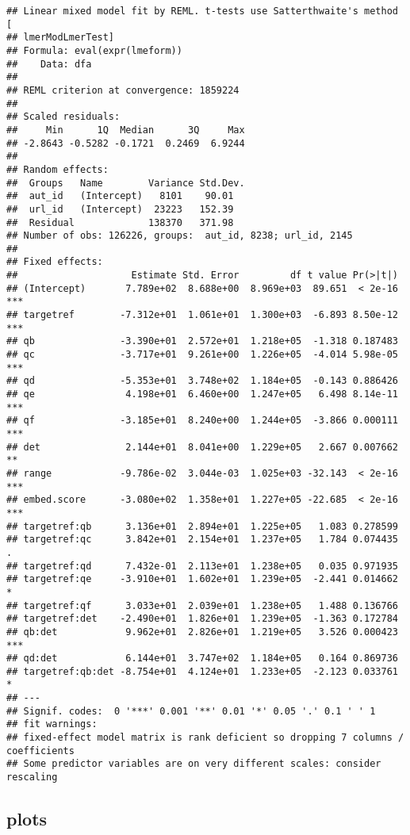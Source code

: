 \documentclass[
  12pt,
  oneside]{book}
\begin{document}
\begin{verbatim}
## Linear mixed model fit by REML. t-tests use Satterthwaite's method [
## lmerModLmerTest]
## Formula: eval(expr(lmeform))
##    Data: dfa
## 
## REML criterion at convergence: 1859224
## 
## Scaled residuals: 
##     Min      1Q  Median      3Q     Max 
## -2.8643 -0.5282 -0.1721  0.2469  6.9244 
## 
## Random effects:
##  Groups   Name        Variance Std.Dev.
##  aut_id   (Intercept)   8101    90.01  
##  url_id   (Intercept)  23223   152.39  
##  Residual             138370   371.98  
## Number of obs: 126226, groups:  aut_id, 8238; url_id, 2145
## 
## Fixed effects:
##                    Estimate Std. Error         df t value Pr(>|t|)    
## (Intercept)       7.789e+02  8.688e+00  8.969e+03  89.651  < 2e-16 ***
## targetref        -7.312e+01  1.061e+01  1.300e+03  -6.893 8.50e-12 ***
## qb               -3.390e+01  2.572e+01  1.218e+05  -1.318 0.187483    
## qc               -3.717e+01  9.261e+00  1.226e+05  -4.014 5.98e-05 ***
## qd               -5.353e+01  3.748e+02  1.184e+05  -0.143 0.886426    
## qe                4.198e+01  6.460e+00  1.247e+05   6.498 8.14e-11 ***
## qf               -3.185e+01  8.240e+00  1.244e+05  -3.866 0.000111 ***
## det               2.144e+01  8.041e+00  1.229e+05   2.667 0.007662 ** 
## range            -9.786e-02  3.044e-03  1.025e+03 -32.143  < 2e-16 ***
## embed.score      -3.080e+02  1.358e+01  1.227e+05 -22.685  < 2e-16 ***
## targetref:qb      3.136e+01  2.894e+01  1.225e+05   1.083 0.278599    
## targetref:qc      3.842e+01  2.154e+01  1.237e+05   1.784 0.074435 .  
## targetref:qd      7.432e-01  2.113e+01  1.238e+05   0.035 0.971935    
## targetref:qe     -3.910e+01  1.602e+01  1.239e+05  -2.441 0.014662 *  
## targetref:qf      3.033e+01  2.039e+01  1.238e+05   1.488 0.136766    
## targetref:det    -2.490e+01  1.826e+01  1.239e+05  -1.363 0.172784    
## qb:det            9.962e+01  2.826e+01  1.219e+05   3.526 0.000423 ***
## qd:det            6.144e+01  3.747e+02  1.184e+05   0.164 0.869736    
## targetref:qb:det -8.754e+01  4.124e+01  1.233e+05  -2.123 0.033761 *  
## ---
## Signif. codes:  0 '***' 0.001 '**' 0.01 '*' 0.05 '.' 0.1 ' ' 1
## fit warnings:
## fixed-effect model matrix is rank deficient so dropping 7 columns / coefficients
## Some predictor variables are on very different scales: consider rescaling
\end{verbatim}

\subsection{plots}\label{plots-2}
\end{document}
